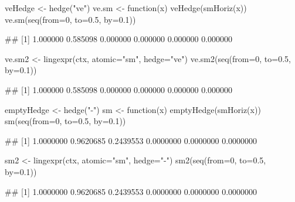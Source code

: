 \documentclass{article}\usepackage[]{graphicx}\usepackage[]{color}
\begin{document}
\begin{Schunk}
% --begin: "hedge"
\begin{Sinput}
veHedge <- hedge("ve")
ve.sm <- function(x) veHedge(smHoriz(x))
ve.sm(seq(from=0, to=0.5, by=0.1))
\end{Sinput}
\begin{Soutput}
## [1] 1.000000 0.585098 0.000000 0.000000 0.000000 0.000000
\end{Soutput}
%
% --end: "hedge"
\end{Schunk}


\begin{Schunk}
% --begin: "lingexpr"
\begin{Sinput}
ve.sm2 <- lingexpr(ctx, atomic="sm", hedge="ve")
ve.sm2(seq(from=0, to=0.5, by=0.1))
\end{Sinput}
\begin{Soutput}
## [1] 1.000000 0.585098 0.000000 0.000000 0.000000 0.000000
\end{Soutput}
%
% --end: "lingexpr"
\end{Schunk}

\begin{Schunk}
% --begin: "emptyhedge1"
\begin{Sinput}
emptyHedge <- hedge("-")
sm <- function(x) emptyHedge(smHoriz(x))
sm(seq(from=0, to=0.5, by=0.1))
\end{Sinput}
\begin{Soutput}
## [1] 1.0000000 0.9620685 0.2439553 0.0000000 0.0000000 0.0000000
\end{Soutput}
%
% --end: "emptyhedge1"
\end{Schunk}

\begin{Schunk}
% --begin: "emptyhedge2"
\begin{Sinput}
sm2 <- lingexpr(ctx, atomic="sm", hedge="-")
sm2(seq(from=0, to=0.5, by=0.1))
\end{Sinput}
\begin{Soutput}
## [1] 1.0000000 0.9620685 0.2439553 0.0000000 0.0000000 0.0000000
\end{Soutput}
%
% --end: "emptyhedge2"
\end{Schunk}
\end{document}
